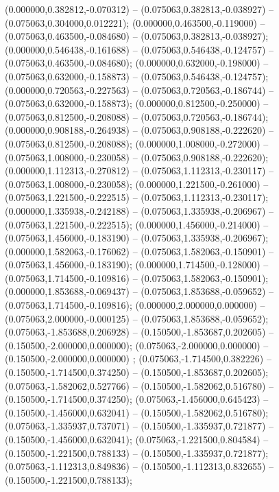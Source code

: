  (0.000000,0.382812,-0.070312) -- (0.075063,0.382813,-0.038927) -- (0.075063,0.304000,0.012221);
 (0.000000,0.463500,-0.119000) -- (0.075063,0.463500,-0.084680) -- (0.075063,0.382813,-0.038927);
 (0.000000,0.546438,-0.161688) -- (0.075063,0.546438,-0.124757) -- (0.075063,0.463500,-0.084680);
 (0.000000,0.632000,-0.198000) -- (0.075063,0.632000,-0.158873) -- (0.075063,0.546438,-0.124757);
 (0.000000,0.720563,-0.227563) -- (0.075063,0.720563,-0.186744) -- (0.075063,0.632000,-0.158873);
 (0.000000,0.812500,-0.250000) -- (0.075063,0.812500,-0.208088) -- (0.075063,0.720563,-0.186744);
 (0.000000,0.908188,-0.264938) -- (0.075063,0.908188,-0.222620) -- (0.075063,0.812500,-0.208088);
 (0.000000,1.008000,-0.272000) -- (0.075063,1.008000,-0.230058) -- (0.075063,0.908188,-0.222620);
 (0.000000,1.112313,-0.270812) -- (0.075063,1.112313,-0.230117) -- (0.075063,1.008000,-0.230058);
 (0.000000,1.221500,-0.261000) -- (0.075063,1.221500,-0.222515) -- (0.075063,1.112313,-0.230117);
 (0.000000,1.335938,-0.242188) -- (0.075063,1.335938,-0.206967) -- (0.075063,1.221500,-0.222515);
 (0.000000,1.456000,-0.214000) -- (0.075063,1.456000,-0.183190) -- (0.075063,1.335938,-0.206967);
 (0.000000,1.582063,-0.176062) -- (0.075063,1.582063,-0.150901) -- (0.075063,1.456000,-0.183190);
 (0.000000,1.714500,-0.128000) -- (0.075063,1.714500,-0.109816) -- (0.075063,1.582063,-0.150901);
 (0.000000,1.853688,-0.069437) -- (0.075063,1.853688,-0.059652) -- (0.075063,1.714500,-0.109816);
 (0.000000,2.000000,0.000000) -- (0.075063,2.000000,-0.000125) -- (0.075063,1.853688,-0.059652);
 (0.075063,-1.853688,0.206928) -- (0.150500,-1.853687,0.202605) -- (0.150500,-2.000000,0.000000);
 (0.075063,-2.000000,0.000000) -- (0.150500,-2.000000,0.000000) ;
 (0.075063,-1.714500,0.382226) -- (0.150500,-1.714500,0.374250) -- (0.150500,-1.853687,0.202605);
 (0.075063,-1.582062,0.527766) -- (0.150500,-1.582062,0.516780) -- (0.150500,-1.714500,0.374250);
 (0.075063,-1.456000,0.645423) -- (0.150500,-1.456000,0.632041) -- (0.150500,-1.582062,0.516780);
 (0.075063,-1.335937,0.737071) -- (0.150500,-1.335937,0.721877) -- (0.150500,-1.456000,0.632041);
 (0.075063,-1.221500,0.804584) -- (0.150500,-1.221500,0.788133) -- (0.150500,-1.335937,0.721877);
 (0.075063,-1.112313,0.849836) -- (0.150500,-1.112313,0.832655) -- (0.150500,-1.221500,0.788133);
